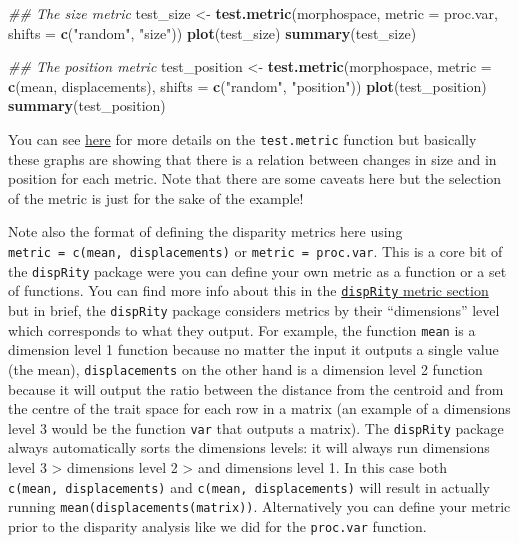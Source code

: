 \documentclass[
]{book}
\newenvironment{Shaded}{\begin{snugshade}}{\end{snugshade}}
\newcommand{\CommentTok}[1]{\textcolor[rgb]{0.56,0.35,0.01}{\textit{#1}}}
\newcommand{\DataTypeTok}[1]{\textcolor[rgb]{0.13,0.29,0.53}{#1}}
\newcommand{\KeywordTok}[1]{\textcolor[rgb]{0.13,0.29,0.53}{\textbf{#1}}}
\newcommand{\NormalTok}[1]{#1}
\newcommand{\StringTok}[1]{\textcolor[rgb]{0.31,0.60,0.02}{#1}}
\begin{document}
\begin{Shaded}
\begin{Highlighting}[]
\CommentTok{\#\# The size metric}
\NormalTok{test\_size \textless{}{-}}\StringTok{ }\KeywordTok{test.metric}\NormalTok{(morphospace, }\DataTypeTok{metric =}\NormalTok{ proc.var,}
                         \DataTypeTok{shifts =} \KeywordTok{c}\NormalTok{(}\StringTok{"random"}\NormalTok{, }\StringTok{"size"}\NormalTok{))}
\KeywordTok{plot}\NormalTok{(test\_size)}
\KeywordTok{summary}\NormalTok{(test\_size)}

\CommentTok{\#\# The position metric}
\NormalTok{test\_position \textless{}{-}}\StringTok{ }\KeywordTok{test.metric}\NormalTok{(morphospace, }\DataTypeTok{metric =} \KeywordTok{c}\NormalTok{(mean, displacements),}
                         \DataTypeTok{shifts =} \KeywordTok{c}\NormalTok{(}\StringTok{"random"}\NormalTok{, }\StringTok{"position"}\NormalTok{))}
\KeywordTok{plot}\NormalTok{(test\_position)}
\KeywordTok{summary}\NormalTok{(test\_position)}
\end{Highlighting}
\end{Shaded}

You can see \protect\hyperlink{test-metric}{here} for more details on the \texttt{test.metric} function but basically these graphs are showing that there is a relation between changes in size and in position for each metric.
Note that there are some caveats here but the selection of the metric is just for the sake of the example!

Note also the format of defining the disparity metrics here using \texttt{metric\ =\ c(mean,\ displacements)} or \texttt{metric\ =\ proc.var}. This is a core bit of the \texttt{dispRity} package were you can define your own metric as a function or a set of functions. You can find more info about this in the \protect\hyperlink{disparity-metrics}{\texttt{dispRity} metric section} but in brief, the \texttt{dispRity} package considers metrics by their ``dimensions'' level which corresponds to what they output. For example, the function \texttt{mean} is a dimension level 1 function because no matter the input it outputs a single value (the mean), \texttt{displacements} on the other hand is a dimension level 2 function because it will output the ratio between the distance from the centroid and from the centre of the trait space for each row in a matrix (an example of a dimensions level 3 would be the function \texttt{var} that outputs a matrix).
The \texttt{dispRity} package always automatically sorts the dimensions levels: it will always run dimensions level 3 \textgreater{} dimensions level 2 \textgreater{} and dimensions level 1. In this case both \texttt{c(mean,\ displacements)} and \texttt{c(mean,\ displacements)} will result in actually running \texttt{mean(displacements(matrix))}.
Alternatively you can define your metric prior to the disparity analysis like we did for the \texttt{proc.var} function.
\end{document}
